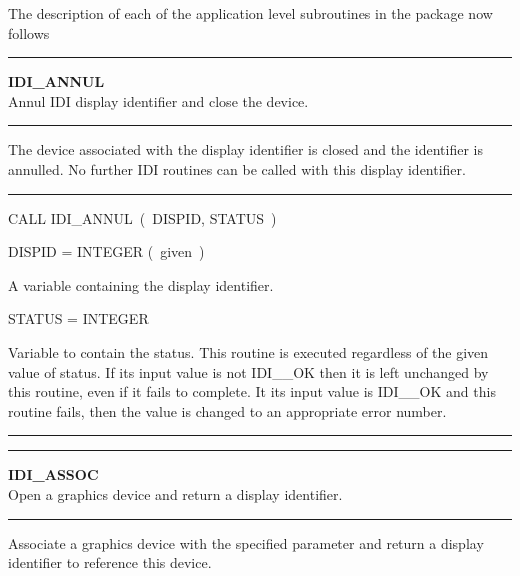 \documentclass[11pt,nolof]{starlink}
\begin{document}
The description of each of the application level subroutines in the package
now follows

\vspace{10mm}
\parbox{160mm}{

\rule{160mm}{0.5mm}

\hspace*{10mm}\parbox{140mm}{
\textbf{IDI\_ANNUL\label{IDI_ANNUL}} \\
Annul IDI display identifier and close the device.}

\rule{160mm}{0.1mm}

\hspace*{10mm}\parbox{140mm}{
The device associated with the display identifier is closed and the
identifier is annulled. No further IDI routines can be called with this
display identifier.}

\rule{160mm}{0.1mm}

\hspace*{10mm}\parbox{140mm}{
CALL IDI\_ANNUL~(~DISPID, STATUS~)}

\hspace*{10mm}\parbox{140mm}{
DISPID = INTEGER \hspace{10mm} (~given~)}

\hspace*{30mm}\parbox{120mm}{
A variable containing the display identifier.}

\hspace*{10mm}\parbox{140mm}{
STATUS = INTEGER}

\hspace*{30mm}\parbox{120mm}{
Variable to contain the status. This routine is executed regardless of the
given value of status. If its input value is not IDI\_\_OK then it is left
unchanged by this routine, even if it fails to complete. It its input value
is IDI\_\_OK and this routine fails, then the value is changed to an
appropriate error number.}

\rule{160mm}{0.5mm}


\rule{160mm}{0.5mm}

\hspace*{10mm}\parbox{140mm}{
\textbf{IDI\_ASSOC\label{IDI_ASSOC}} \\
Open a graphics device and return a display identifier.}

\rule{160mm}{0.1mm}

\hspace*{10mm}\parbox{140mm}{
Associate a graphics device with the specified parameter and return a
display identifier to reference this device.}

}
\end{document}
